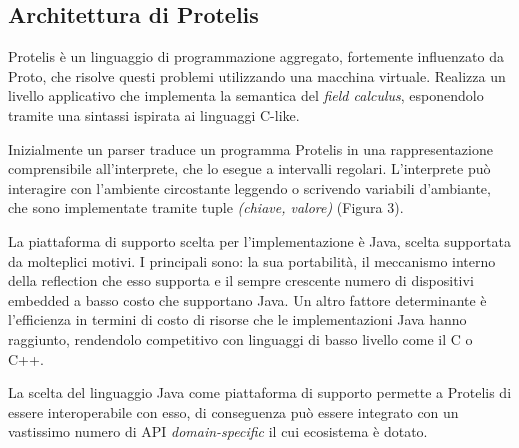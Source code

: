\subsection{Architettura di Protelis}\label{subsec:Architettura di Protelis}
Protelis è un linguaggio di programmazione aggregato, fortemente influenzato da
Proto\cite{Proto}, che risolve questi problemi utilizzando una macchina
virtuale\cite{Protelis}. Realizza un livello applicativo che implementa la semantica del
\textit{field calculus}, esponendolo tramite una sintassi ispirata ai linguaggi
C-like.

Inizialmente un parser traduce un programma Protelis in
una rappresentazione comprensibile all'interprete, che lo esegue a intervalli
regolari. L'interprete può interagire con l'ambiente circostante leggendo o
scrivendo variabili d'ambiante, che sono implementate tramite tuple
\textit{(chiave, valore)} (Figura 3).

La piattaforma di supporto scelta per l'implementazione è Java, scelta
supportata da molteplici motivi\cite{Protelis}. I principali sono: la sua
portabilità, il meccanismo interno della reflection che esso supporta e il
sempre crescente numero di dispositivi embedded a basso costo che supportano
Java. Un altro fattore determinante è l'efficienza in termini di costo di
risorse che le implementazioni Java hanno raggiunto, rendendolo competitivo con
linguaggi di basso livello come il C o C++.

La scelta del linguaggio Java come piattaforma di supporto permette a Protelis
di essere interoperabile con esso, di conseguenza può essere integrato con un
vastissimo numero di API \textit{domain-specific} il cui ecosistema è dotato.
